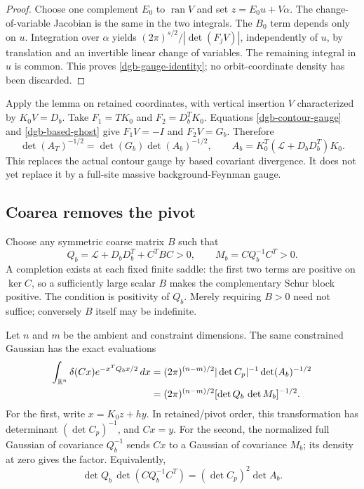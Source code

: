 \documentclass[11pt]{article}
\theoremstyle{remark}
\begin{document}
\begin{proof}
Choose one complement $E_0$ to $\operatorname{ran}V$ and set
$z=E_0u+V\alpha$. The change-of-variable Jacobian is the same
in the two integrals. The $B_0$ term depends only on $u$.
Integration over $\alpha$ yields
$(2\pi)^{s/2}/|\det(F_jV)|$, independently of $u$, by
translation and an invertible linear change of variables.
The remaining integral in $u$ is common. This proves
\eqref{dgb-gauge-identity}; no orbit-coordinate density
has been discarded.
\end{proof}

Apply the lemma on retained coordinates, with vertical insertion
$V$ characterized by $K_0V=D_b$. Take
$F_1=TK_0$ and $F_2=D_b^TK_0$. Equations
\eqref{dgb-contour-gauge} and \eqref{dgb-based-ghost} give
$F_1V=-I$ and $F_2V=G_b$. Therefore
\begin{equation}
 \det(A_T)^{-1/2}
     =\det(G_b)\det(A_b)^{-1/2},\qquad
 A_b=K_0^T(\mathcal L+D_bD_b^T)K_0.
 \label{dgb-divergence-replacement}
\end{equation}
This replaces the actual contour gauge by based covariant
divergence. It does not yet replace it by a full-site massive
background-Feynman gauge.

\subsection{Coarea removes the pivot}
\label{dgb-coarea-section}

Choose any symmetric coarse matrix $B$ such that
\begin{equation}
 Q_b=\mathcal L+D_bD_b^T+C^TBC>0,\qquad
 M_b=CQ_b^{-1}C^T>0.
 \label{dgb-completion}
\end{equation}
A completion exists at each fixed finite saddle: the first
two terms are positive on $\ker C$, so a sufficiently large
scalar $B$ makes the complementary Schur block positive.
The condition is positivity of $Q_b$. Merely requiring
$B>0$ need not suffice; conversely $B$ itself may be indefinite.

Let $n$ and $m$ be the ambient and constraint dimensions.
The same constrained Gaussian has the exact evaluations
\begin{align}
 \int_{\mathbb R^n}\delta(Cx)e^{-x^TQ_bx/2}\,dx
  &=(2\pi)^{(n-m)/2}|\det C_p|^{-1}\det(A_b)^{-1/2}
       \notag\\
  &=(2\pi)^{(n-m)/2}
           [\det Q_b\,\det M_b]^{-1/2}.
 \label{dgb-coarea-integral}
\end{align}
For the first, write $x=K_0z+hy$. In retained/pivot order,
this transformation has determinant $(\det C_p)^{-1}$,
and $Cx=y$. For the second, the normalized full Gaussian
of covariance $Q_b^{-1}$ sends $Cx$ to a Gaussian of covariance
$M_b$; its density at zero gives the factor.
Equivalently,
\begin{equation}
 \det Q_b\,\det(CQ_b^{-1}C^T)
                         =(\det C_p)^2\det A_b .
 \label{dgb-coarea-determinant}
\end{equation}
\end{document}
